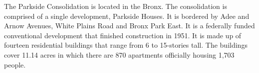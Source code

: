 The Parkside Consolidation is located in the Bronx. The consolidation is comprised of a single development, Parkside Houses. It is bordered by Adee and Arnow Avenues, White Plains Road and Bronx Park East. It is a federally funded conventional development that finished construction in 1951. It is made up of fourteen residential buildings that range from 6 to 15-stories tall. The buildings cover 11.14 acres in which there are 870 apartments officially housing 1,703 people.